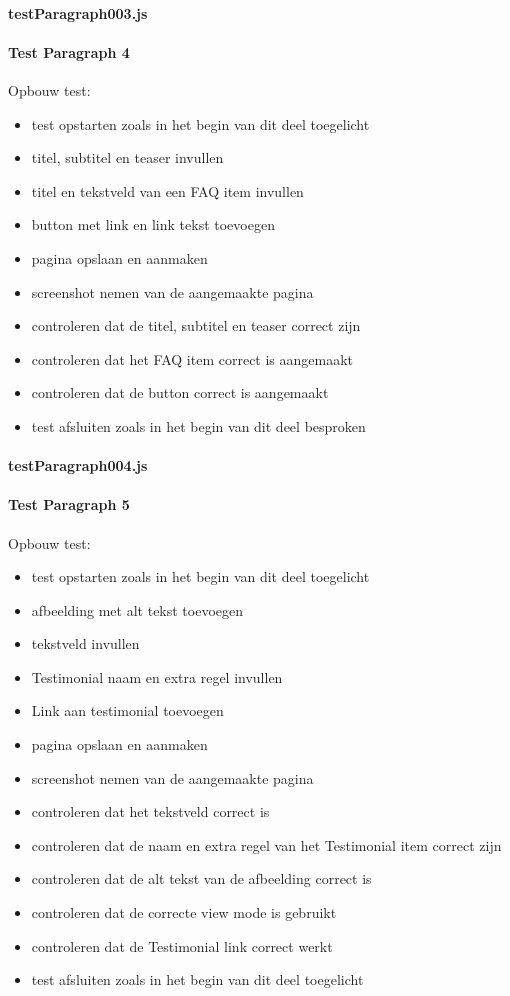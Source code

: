 \paragraph{testParagraph003.js}


\clearpage
\paragraph{Test Paragraph 4}
\label{test4}
Opbouw test: 
\begin{itemize}
\item test opstarten zoals in het begin van dit deel toegelicht
\item titel, subtitel en teaser invullen
\item titel  en tekstveld van een FAQ item invullen
\item button met link en link tekst toevoegen
\item pagina opslaan en aanmaken
\item screenshot nemen van de aangemaakte pagina
\item controleren dat de titel, subtitel en teaser correct zijn
\item controleren dat het FAQ item correct is aangemaakt
\item controleren dat de button correct is aangemaakt
\item test afsluiten zoals in het begin van dit deel besproken
\end{itemize}
\paragraph{testParagraph004.js}


\clearpage
\paragraph{Test Paragraph 5}
\label{test5}
Opbouw test: 
\begin{itemize}
\item test opstarten zoals in het begin van dit deel toegelicht
\item afbeelding met alt tekst toevoegen
\item tekstveld invullen
\item Testimonial naam en extra regel invullen
\item Link aan testimonial toevoegen
\item pagina opslaan en aanmaken
\item screenshot nemen van de aangemaakte pagina
\item controleren dat het tekstveld correct is
\item controleren dat de naam en extra regel van het Testimonial item correct zijn
\item controleren dat de alt tekst van de afbeelding correct is
\item controleren dat de correcte view mode is gebruikt
\item controleren dat de Testimonial link correct werkt
\item test afsluiten zoals in het begin van dit deel toegelicht
\end{itemize}
